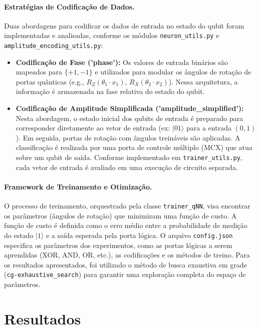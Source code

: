 \documentclass[12pt, a4paper]{article}
\begin{document}
\paragraph{Estratégias de Codificação de Dados.}
Duas abordagens para codificar os dados de entrada no estado do qubit foram implementadas e analisadas, conforme os módulos \texttt{neuron\_utils.py} e \texttt{amplitude\_encoding\_utils.py}:
\begin{itemize}
    \item \textbf{Codificação de Fase ('phase'):} Os valores de entrada binários são mapeados para $\{+1, -1\}$ e utilizados para modular os ângulos de rotação de portas quânticas (e.g., $R_{Z}(\theta_{1}\cdot x_{1})$, $R_{X}(\theta_{2}\cdot x_{2})$). Nessa arquitetura, a informação é armazenada na fase relativa do estado do qubit.
    \item \textbf{Codificação de Amplitude Simplificada ('amplitude\_simplified'):} Nesta abordagem, o estado inicial dos qubits de entrada é preparado para corresponder diretamente ao vetor de entrada (ex: $|01\rangle$ para a entrada $(0,1)$). Em seguida, portas de rotação com ângulos treináveis são aplicadas. A classificação é realizada por uma porta de controle múltiplo (MCX) que atua sobre um qubit de saída. Conforme implementado em \texttt{trainer\_utils.py}, cada vetor de entrada é avaliado em uma execução de circuito separada.
\end{itemize}

\paragraph{Framework de Treinamento e Otimização.}
O processo de treinamento, orquestrado pela classe \texttt{trainer\_qNN}, visa encontrar os parâmetros (ângulos de rotação) que minimizam uma função de custo. A função de custo é definida como o erro médio entre a probabilidade de medição do estado $|1\rangle$ e a saída esperada pela porta lógica. O arquivo \texttt{config.json} especifica os parâmetros dos experimentos, como as portas lógicas a serem aprendidas (XOR, AND, OR, etc.), as codificações e os métodos de treino. Para os resultados apresentados, foi utilizado o método de busca exaustiva em grade (\texttt{cg-exhaustive\_search}) para garantir uma exploração completa do espaço de parâmetros.

\section*{Resultados}
\end{document}
